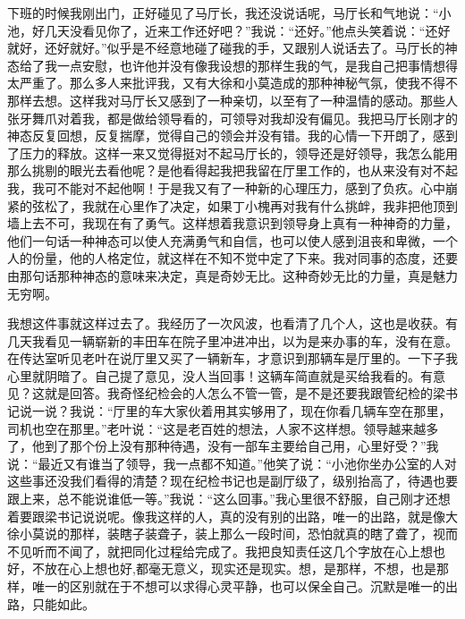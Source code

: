 \documentclass[12pt,oneside]{book}
\begin{document}
下班的时候我刚出门，正好碰见了马厅长，我还没说话呢，马厅长和气地说：``小池，好几天没看见你了，近来工作还好吧？''我说：``还好。''他点头笑着说：``还好就好，还好就好。''似乎是不经意地碰了碰我的手，又跟别人说话去了。马厅长的神态给了我一点安慰，也许他并没有像我设想的那样生我的气，是我自己把事情想得太严重了。那么多人来批评我，又有大徐和小莫造成的那种神秘气氛，使我不得不那样去想。这样我对马厅长又感到了一种亲切，以至有了一种温情的感动。那些人张牙舞爪对着我，都是做给领导看的，可领导对我却没有偏见。我把马厅长刚才的神态反复回想，反复揣摩，觉得自己的领会并没有错。我的心情一下开朗了，感到了压力的释放。这样一来又觉得挺对不起马厅长的，领导还是好领导，我怎么能用那么挑剔的眼光去看他呢？是他看得起我把我留在厅里工作的，也从来没有对不起我，我可不能对不起他啊！于是我又有了一种新的心理压力，感到了负疚。心中崩紧的弦松了，我就在心里作了决定，如果丁小槐再对我有什么挑衅，我非把他顶到墙上去不可，我现在有了勇气。这样想着我意识到领导身上真有一种神奇的力量，他们一句话一种神态可以使人充满勇气和自信，也可以使人感到沮丧和卑微，一个人的份量，他的人格定位，就这样在不知不觉中定了下来。我对同事的态度，还要由那句话那种神态的意味来决定，真是奇妙无比。这种奇妙无比的力量，真是魅力无穷啊。

我想这件事就这样过去了。我经历了一次风波，也看清了几个人，这也是收获。有几天我看见一辆崭新的丰田车在院子里冲进冲出，以为是来办事的车，没有在意。在传达室听见老叶在说厅里又买了一辆新车，才意识到那辆车是厅里的。一下子我心里就阴暗了。自己提了意见，没人当回事！这辆车简直就是买给我看的。有意见？这就是回答。我奇怪纪检会的人怎么不管一管，是不是还要我跟管纪检的梁书记说一说？我说：``厅里的车大家伙着用其实够用了，现在你看几辆车空在那里，司机也空在那里。''老叶说：``这是老百姓的想法，人家不这样想。领导越来越多了，他到了那个份上没有那种待遇，没有一部车主要给自己用，心里好受？''我说：``最近又有谁当了领导，我一点都不知道。''他笑了说：``小池你坐办公室的人对这些事还没我们看得的清楚？现在纪检书记也是副厅级了，级别抬高了，待遇也要跟上来，总不能说谁低一等。''我说：``这么回事。''我心里很不舒服，自己刚才还想着要跟梁书记说说呢。像我这样的人，真的没有别的出路，唯一的出路，就是像大徐小莫说的那样，装瞎子装聋子，装上那么一段时间，恐怕就真的瞎了聋了，视而不见听而不闻了，就把同化过程给完成了。我把良知责任这几个字放在心上想也好，不放在心上想也好,都毫无意义，现实还是现实。想，是那样，不想，也是那样，唯一的区别就在于不想可以求得心灵平静，也可以保全自己。沉默是唯一的出路，只能如此。
\end{document}
